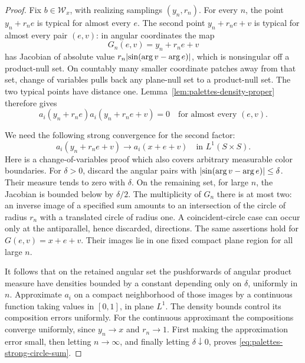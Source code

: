 \begin{proof}
Fix \(b\in\mathcal W_x\), with realizing samplings \((y_n,r_n)\).
For every \(n\), the point \(y_n+r_ne\) is typical for almost every
\(e\).  The second point \(y_n+r_ne+v\) is typical for almost every
pair \((e,v)\): in angular coordinates the map
\[
 G_n(e,v)=y_n+r_ne+v
\]
has Jacobian of absolute value
\(r_n\lvert\sin(\arg v-\arg e)\rvert\), which is nonsingular off a
product-null set.  On countably many smaller coordinate patches
away from that set, change of variables pulls back any plane-null
set to a product-null set.  The two typical points have distance
one.  Lemma~\ref{lem:palettes-density-proper} therefore gives
\begin{equation}\label{eq:palettes-sample-disjoint}
 a_i(y_n+r_ne)a_i(y_n+r_ne+v)=0
 \quad\text{for almost every }(e,v).
\end{equation}

We need the following strong convergence for the second factor:
\begin{equation}\label{eq:palettes-strong-circle-sum}
 a_i(y_n+r_ne+v)\longrightarrow a_i(x+e+v)
 \quad\text{in }L^1(S\times S).
\end{equation}
Here is a change-of-variables proof which also covers arbitrary
measurable color boundaries.  For \(\delta>0\), discard the angular
pairs with
\(\lvert\sin(\arg v-\arg e)\rvert\le\delta\).  Their measure tends to
zero with \(\delta\).  On the remaining set, for large \(n\), the
Jacobian is bounded below by \(\delta/2\).  The multiplicity of
\(G_n\) there is at most two: an inverse image of a specified
sum amounts to an intersection of the circle of radius \(r_n\)
with a translated circle of radius one.  A coincident-circle
case can occur only at the antiparallel, hence discarded, directions.
The same assertions hold for \(G(e,v)=x+e+v\).
Their images lie in one fixed compact plane region for all large \(n\).

It follows that on the retained angular set the pushforwards of
angular product measure have densities bounded by a constant
depending only on \(\delta\), uniformly in \(n\).
Approximate \(a_i\) on a compact neighborhood of those images by
a continuous function taking values in \([0,1]\), in plane \(L^1\).
The density bounds control its composition errors uniformly.
For the continuous approximant the compositions converge uniformly,
since \(y_n\to x\) and \(r_n\to1\).
First making the approximation error small, then letting \(n\to\infty\),
and finally letting \(\delta\downarrow0\), proves
\eqref{eq:palettes-strong-circle-sum}.


\end{proof}
